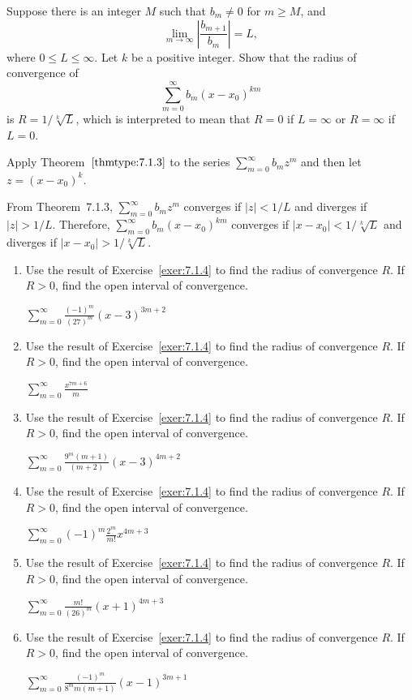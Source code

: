 \documentclass{ximera}
\begin{document}
\begin{problem}\label{exer:7.1.4}
Suppose there is an integer $M$ such that $b_m\ne0$ for $m\ge M$,
and
$$
\lim_{m\to\infty}\left|\frac{b_{m+1}}{b_m}\right|=L,
$$
where $0\le L\le\infty$. Let $k$ be a positive integer. Show that the
radius of convergence of
$$
\sum_{m=0}^\infty b_m(x-x_0)^{km}
$$
is $R=1/\sqrt[k]L$, which is interpreted to mean that $R=0$ if
$L=\infty$ or $R=\infty$ if $L=0$.

\begin{hint}
Apply Theorem~$\ref{thmtype:7.1.3}$
to the series $\sum_{m=0}^\infty b_mz^m$ and then let $z=(x-x_0)^k$.    
\end{hint}

\begin{solution}
    From Theorem~7.1.3, $\sum_{m=0}^\infty b_mz^m$ converges
if $|z|<1/L$ and diverges if $|z|>1/L$.
 Therefore,
$\sum_{m=0}^\infty b_m(x-x_0)^{km}$ converges if
$|x-x_0|<1/\sqrt[k]{L}$ and diverges if $|x-x_0|>1/\sqrt[k]{L}$.
\end{solution}
\end{problem}

\begin{problem}\label{exer:7.1.5}

\begin{enumerate}
\item Use the result of Exercise~\ref{exer:7.1.4} to find the radius of convergence $R$. If $R>0$, find the open interval of convergence.
    
 $\sum_{m=0}^\infty\frac{(-1)^m}{(27)^m}(x-3)^{3m+2}$
 
\item Use the result of Exercise~\ref{exer:7.1.4} to find the radius of convergence $R$. If $R>0$, find the open interval of convergence.
 
 $\sum_{m=0}^\infty\frac{x^{7m+6}}{m}$ 
 
\item Use the result of Exercise~\ref{exer:7.1.4} to find the radius of convergence $R$. If $R>0$, find the open interval of convergence.
 
 $\sum_{m=0}^\infty\frac{9^m(m+1)}{(m+2)}(x-3)^{4m+2}$
 
\item Use the result of Exercise~\ref{exer:7.1.4} to find the radius of convergence $R$. If $R>0$, find the open interval of convergence.
 
 $\sum_{m=0}^\infty(-1)^m\frac{2^m}{m!}x^{4m+3}$
 
\item Use the result of Exercise~\ref{exer:7.1.4} to find the radius of convergence $R$. If $R>0$, find the open interval of convergence.
 
 $\sum_{m=0}^\infty\frac{m!}{(26)^m}(x+1)^{4m+3}$
 
\item Use the result of Exercise~\ref{exer:7.1.4} to find the radius of convergence $R$. If $R>0$, find the open interval of convergence.
 
 $\sum_{m=0}^\infty\frac{(-1)^m}{8^mm(m+1)}(x-1)^{3m+1}$
\end{enumerate}
\end{problem}
\end{document}

